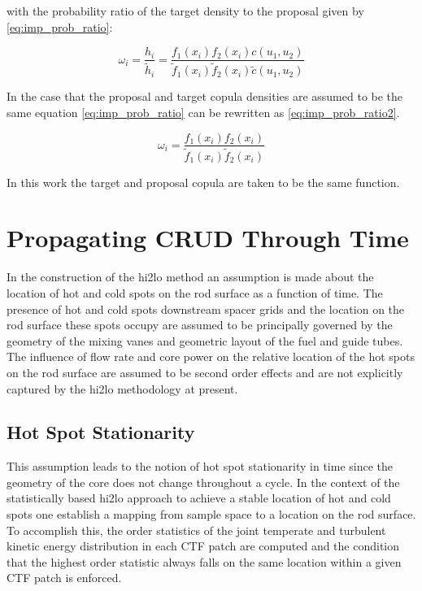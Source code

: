 with the probability ratio of the target density to the proposal given by \ref{eq:imp_prob_ratio}:

\begin{equation}
\omega_i = \frac{h_i}{\tilde h_i} = \frac{f_1(x_i) f_2(x_i)c(u_1, u_2)}{\tilde f_1(x_i) \tilde f_2(x_i) \tilde c(u_1, u_2)}
\label{eq:imp_prob_ratio}
\end{equation}

In the case that the proposal and target copula densities are assumed to be the same equation \ref{eq:imp_prob_ratio} can be rewritten as \ref{eq:imp_prob_ratio2}.

\begin{equation}
\omega_i = \frac{f_1(x_i) f_2(x_i)}{\tilde f_1(x_i) \tilde f_2(x_i)}
\label{eq:imp_prob_ratio2}
\end{equation}

In this work the target and proposal copula are taken to be the same function.

\section{Propagating CRUD Through Time}

In the construction of the hi2lo method an assumption is made about the location of hot and cold spots on the rod surface as a function of time.   The presence of hot and cold spots downstream spacer grids and the location on the rod surface these spots occupy are assumed to be principally governed by the geometry of the mixing vanes and geometric layout of the fuel and guide tubes.  The influence of flow rate and core power on the relative location of the hot spots on the rod surface are assumed to be second order effects and are not explicitly captured by the hi2lo methodology at present.

\subsection{Hot Spot Stationarity}

This assumption leads to the notion of hot spot stationarity in time since the geometry of the core does not change throughout a cycle.  In the context of the statistically based hi2lo approach to achieve a stable location of hot and cold spots one establish a mapping from sample space to a location on the rod surface.  To accomplish this, the order statistics of the joint temperate and turbulent kinetic energy distribution in each CTF patch are computed and the condition that the highest order statistic always falls on the same location within a given CTF patch is enforced.

